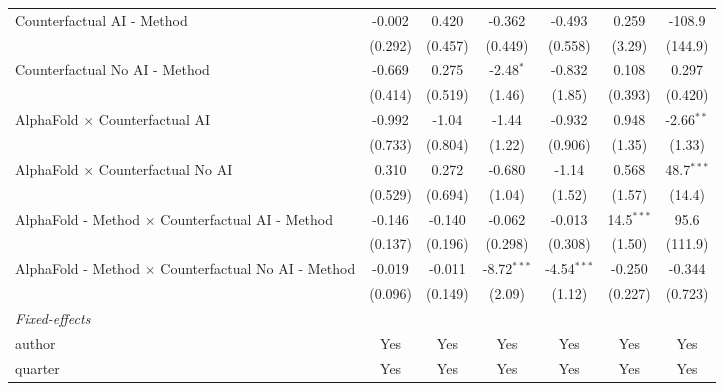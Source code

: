 \begin{tabular}{lcccccc}
   Counterfactual AI - Method                                 & -0.002  & 0.420   & -0.362        & -0.493        & 0.259        & -108.9\\   
                                                              & (0.292) & (0.457) & (0.449)       & (0.558)       & (3.29)       & (144.9)\\   
   Counterfactual No AI - Method                              & -0.669  & 0.275   & -2.48$^{*}$   & -0.832        & 0.108        & 0.297\\   
                                                              & (0.414) & (0.519) & (1.46)        & (1.85)        & (0.393)      & (0.420)\\   
   AlphaFold $\times$ Counterfactual AI                       & -0.992  & -1.04   & -1.44         & -0.932        & 0.948        & -2.66$^{**}$\\   
                                                              & (0.733) & (0.804) & (1.22)        & (0.906)       & (1.35)       & (1.33)\\   
   AlphaFold $\times$ Counterfactual No AI                    & 0.310   & 0.272   & -0.680        & -1.14         & 0.568        & 48.7$^{***}$\\   
                                                              & (0.529) & (0.694) & (1.04)        & (1.52)        & (1.57)       & (14.4)\\   
   AlphaFold - Method $\times$ Counterfactual AI - Method     & -0.146  & -0.140  & -0.062        & -0.013        & 14.5$^{***}$ & 95.6\\   
                                                              & (0.137) & (0.196) & (0.298)       & (0.308)       & (1.50)       & (111.9)\\   
   AlphaFold - Method $\times$ Counterfactual No AI - Method  & -0.019  & -0.011  & -8.72$^{***}$ & -4.54$^{***}$ & -0.250       & -0.344\\   
                                                              & (0.096) & (0.149) & (2.09)        & (1.12)        & (0.227)      & (0.723)\\   
   \midrule
   \emph{Fixed-effects}\\
   author                                                     & Yes     & Yes     & Yes           & Yes           & Yes          & Yes\\  
   quarter                                                    & Yes     & Yes     & Yes           & Yes           & Yes          & Yes\\  

\end{tabular}
